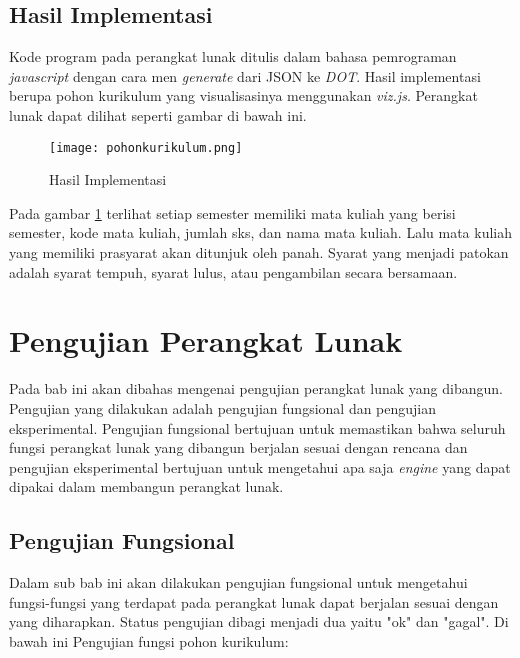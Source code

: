 \subsection{Hasil Implementasi}
\label{sec: Hasil Implementasi}

Kode program pada perangkat lunak ditulis dalam bahasa pemrograman \textit{javascript} dengan cara men \textit{generate} dari JSON ke \textit{DOT}. Hasil implementasi berupa pohon kurikulum yang visualisasinya menggunakan \textit{viz.js}. Perangkat lunak dapat dilihat seperti gambar di bawah ini.

\begin{figure}[H]
		\texttt{[image: pohonkurikulum.png]}
		\caption{Hasil Implementasi}
		\label{fig: pohon kurikulum}
\end{figure}	 

Pada gambar \ref{fig: pohon kurikulum} terlihat setiap semester memiliki mata kuliah yang berisi semester, kode mata kuliah, jumlah sks, dan nama mata kuliah. Lalu mata kuliah yang memiliki prasyarat akan ditunjuk oleh panah. Syarat yang menjadi patokan adalah syarat tempuh, syarat lulus, atau pengambilan secara bersamaan.

\section{Pengujian Perangkat Lunak}
\label{sec: Pengujian Perangkat Lunak}

Pada bab ini akan dibahas mengenai pengujian perangkat lunak yang dibangun. Pengujian yang dilakukan adalah pengujian fungsional dan pengujian eksperimental. Pengujian fungsional bertujuan untuk memastikan bahwa seluruh fungsi perangkat lunak yang dibangun berjalan sesuai dengan rencana dan pengujian eksperimental bertujuan untuk mengetahui apa saja \textit{engine} yang dapat dipakai dalam membangun perangkat lunak.

\subsection{Pengujian Fungsional}
\label{sec: Pengujian Fungsional}
Dalam sub bab ini akan dilakukan pengujian fungsional untuk mengetahui fungsi-fungsi yang terdapat
pada perangkat lunak dapat berjalan sesuai dengan yang diharapkan. Status pengujian dibagi
menjadi dua yaitu "ok" dan "gagal". Di bawah ini Pengujian fungsi pohon kurikulum:

